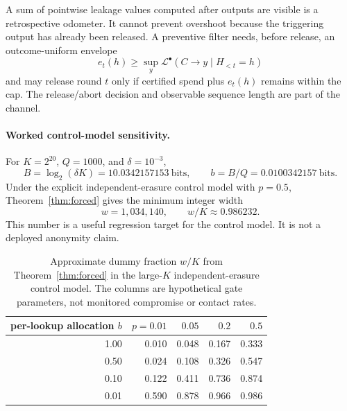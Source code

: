 \documentclass[11pt]{article}
\newcommand{\PML}{\mathcal{L}^{\bullet}}
\newcommand{\bits}{\mathrm{bits}}
\newcommand{\logtwo}{\log_2}
\begin{document}
A sum of pointwise leakage values computed after outputs are visible is a retrospective odometer. It cannot prevent overshoot because the triggering output has already been released. A preventive filter needs, before release, an outcome-uniform envelope
\[
e_t(h)\ge \sup_y \PML(C\to y\mid H_{<t}=h)
\]
and may release round \(t\) only if certified spend plus \(e_t(h)\) remains within the cap. The release/abort decision and observable sequence length are part of the channel.

\paragraph{Worked control-model sensitivity.}
For \(K=2^{20}\), \(Q=1000\), and \(\delta=10^{-3}\),
\[
B=\logtwo(\delta K)=10.0342157153\ \bits,
\qquad b=B/Q=0.0100342157\ \bits.
\]
Under the explicit independent-erasure control model with \(p=0.5\), Theorem~\ref{thm:forced} gives the minimum integer width
\[
w=1{,}034{,}140,
\qquad w/K\approx0.986232.
\]
This number is a useful regression target for the control model. It is not a deployed anonymity claim.

\begin{table}[t]
\centering
\small
\begin{tabular}{@{}r r r r r@{}}
\toprule
per-lookup allocation \(b\) & \(p=0.01\) & \(0.05\) & \(0.2\) & \(0.5\) \\
\midrule
1.00 & 0.010 & 0.048 & 0.167 & 0.333 \\
0.50 & 0.024 & 0.108 & 0.326 & 0.547 \\
0.10 & 0.122 & 0.411 & 0.736 & 0.874 \\
0.01 & 0.590 & 0.878 & 0.966 & 0.986 \\
\bottomrule
\end{tabular}
\caption{Approximate dummy fraction \(w/K\) from Theorem~\ref{thm:forced} in the large-\(K\) independent-erasure control model. The columns are hypothetical gate parameters, not monitored compromise or contact rates.}
\label{tab:sensitivity}
\end{table}
\end{document}
